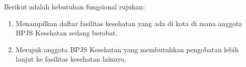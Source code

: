 Berikut adalah kebutuhan fungsional rujukan:
\begin{enumerate}
	\item Menampilkan daftar fasilitas kesehatan yang ada di kota di mana anggota BPJS Kesehatan sedang berobat.
	\item Merujuk anggota BPJS Kesehatan yang membutuhkan pengobatan lebih lanjut ke fasilitas kesehatan lainnya.
\end{enumerate}